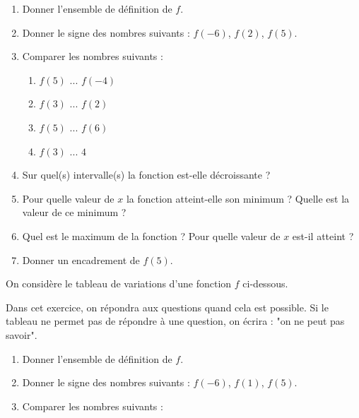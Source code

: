 {\begin{Exercice}
\begin{enumerate}
\item Donner l'ensemble de définition de \( f \).
\item Donner le signe des nombres suivants : \( f(-6) \), \( f(2) \), \( f(5) \).
\item Comparer les nombres suivants :

\begin{enumerate}

\item \( f(5) \) ... \( f(-4) \)
\item \( f(3) \) ... \( f(2) \)
\item \( f(5) \) ... \( f(6) \)
\item \( f(3) \) ... \( 4 \)
\end{enumerate}
\item Sur quel(s) intervalle(s) la fonction est-elle décroissante ?
\item Pour quelle valeur de \( x \) la fonction atteint-elle son minimum ? Quelle est la valeur de ce minimum ?
\item Quel est le maximum de la fonction ? Pour quelle valeur de \( x \) est-il atteint ?
\item Donner un encadrement de \( f(5) \).
\end{enumerate}
\end{Exercice}

\newpage

\begin{Exercice}
On considère le tableau de variations d'une fonction \( f \) ci-dessous. 
\begin{center}
\end{center}

Dans cet exercice, on répondra aux questions quand cela est possible. Si le tableau ne permet pas de répondre à une question, on écrira : "on ne peut pas savoir".
\begin{enumerate}

\item Donner l'ensemble de définition de \( f \).
\item Donner le signe des nombres suivants : \( f(-6) \), \( f(1) \), \( f(5) \).
\item Comparer les nombres suivants :
\begin{enumerate}


\end{enumerate}
\end{enumerate}
\end{Exercice}}
